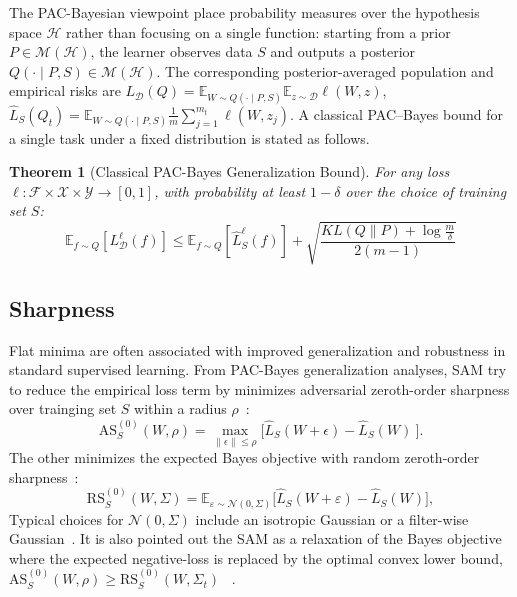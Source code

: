 \documentclass{article}
\theoremstyle{plain}
\newtheorem{theorem}{Theorem}[section]
\theoremstyle{definition}
\theoremstyle{remark}
\begin{document}
The PAC-Bayesian viewpoint place probability measures over the hypothesis space $\mathcal{H}$ rather than focusing on a single function: starting from a prior $P\in\mathcal M(\mathcal H)$, the learner observes data $S$ and outputs a posterior $Q(\cdot\mid P,S)\in\mathcal M(\mathcal H)$\cite{mcallesterPACBayesianStochasticModel2003}. The corresponding posterior-averaged population and empirical risks  are $
L_{\mathcal D}(Q)
=
\mathbb E_{W \sim Q(\cdot \mid P,S)}\mathbb E_{z\sim\mathcal D}\ell(W,z)
$,
$
\hat L_{S}(Q_t)
=
\mathbb E_{W \sim Q(\cdot \mid P,S)}\frac{1}{m}\sum_{j=1}^{m_t}\ell(W,z_{j}).
$
A classical PAC--Bayes bound for a single task under a fixed distribution is stated as follows.
\begin{theorem}[Classical PAC-Bayes Generalization Bound]\cite{mcallesterPACBayesianStochasticModel2003}
\label{theorem:classical}
For any loss $\ell: \mathcal{F} \times \mathcal{X} \times \mathcal{Y} \to [0,1]$, with probability at least $1-\delta$ over the choice of training set $S$:
    \[\mathbb{E}_{f \sim Q}[L_{\mathcal{D}}^{\ell}(f)] \leq \mathbb{E}_{f \sim Q}[\hat{L}_S^{\ell}(f)] + \sqrt{\frac{KL(Q\|P) + \log \frac{m}{\delta}}{2(m-1)}}\]
\end{theorem}

\subsection{Sharpness}

Flat minima are often associated with improved generalization and robustness in standard supervised learning. 
From PAC-Bayes generalization analyses, SAM try to reduce the empirical loss term by minimizes  adversarial zeroth-order sharpness over trainging set $S$ within a radius $\rho$~\citep{AWP2020,foretSharpnessAwareMinimizationEfficiently2021}: 
$$\mathrm{AS}^{(0)}_S(W,\rho) =\max_{ \| \epsilon \|\leq \rho } \Big[ \hat{L}_{S}(W+{\epsilon})-\hat{L}_{S}(W)\ \Big].$$
The other minimizes the expected Bayes objective with random zeroth-order sharpness~\citep{liRevisitingRandomWeight2024,jiang2019fantasticgeneralizationmeasures}:
$$\mathrm{RS}_S^{(0)}({W}, \Sigma)
 =
 \mathbb{E}_{\varepsilon \sim \mathcal{N}(0,\Sigma)}
 \big[
 \hat{L}_{S}({W}+\varepsilon) - \hat{L}_{S}({W})
 \big],$$
Typical choices for $\mathcal{N}(0,\Sigma)$ include an isotropic Gaussian or a filter-wise Gaussian~\citep{pmlr-v151-bisla22a}.  It is also pointed out the SAM  as a relaxation of the Bayes objective where the expected negative-loss is replaced by the optimal convex lower bound, $\mathrm{AS}^{(0)}_S(W,\rho) \geq \mathrm{RS}_S^{(0)}({W}, \Sigma_t)$ ~\cite{mollenhoffSAMOptimalRelaxation2022}.
\end{document}
